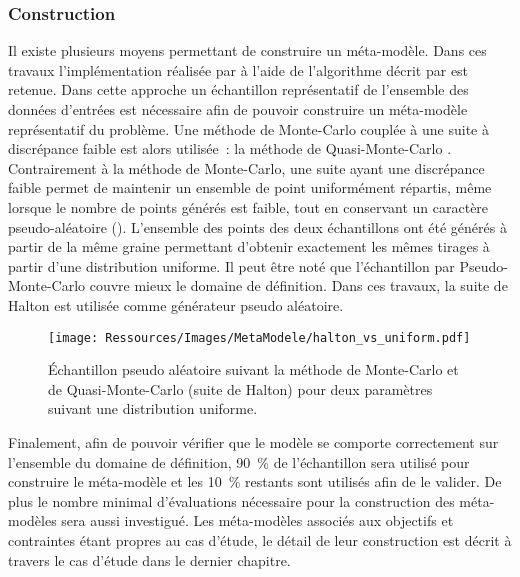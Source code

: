 \subsubsection{Construction} %
\label{ssub:construction}
Il existe plusieurs moyens permettant de construire un méta-modèle. Dans ces travaux
l’implémentation réalisée par \textcite{Rania2013} à l’aide de l’algorithme décrit par
\textcite{Malen2009} est retenue.
Dans cette approche un échantillon représentatif de l’ensemble des données d’entrées est
nécessaire afin de pouvoir construire un méta-modèle représentatif du problème. Une
méthode de Monte-Carlo couplée à une suite à discrépance faible est alors utilisée~: la
méthode de Quasi-Monte-Carlo \parencite{Caflisch19981}. Contrairement à la méthode de
Monte-Carlo, une suite ayant une discrépance faible permet de maintenir un ensemble de
point uniformément répartis, même lorsque le nombre de points générés est faible, tout en
conservant un caractère pseudo-aléatoire (). L’ensemble des
points des deux échantillons ont été générés à partir de la même graine permettant
d’obtenir exactement les mêmes tirages à partir d’une distribution uniforme. Il peut être
noté que l’échantillon par Pseudo-Monte-Carlo couvre mieux le domaine de définition. Dans
ces travaux, la suite de Halton est utilisée comme générateur pseudo aléatoire.

\begin{figure}
    \centering
    \texttt{[image: Ressources/Images/MetaModele/halton\_vs\_uniform.pdf]}
    \caption[Échantillon suivant la méthode de Monte-Carlo et de Quasi-Monte-Carlo]
            {Échantillon pseudo aléatoire suivant la méthode de Monte-Carlo et de
             Quasi-Monte-Carlo (suite de Halton) pour deux paramètres suivant une
             distribution uniforme.}
    \label{fig:halton_vs_uniform}
\end{figure}

Finalement, afin de pouvoir vérifier que le modèle se comporte correctement sur l’ensemble
du domaine de définition, \SI{90}{\percent} de l’échantillon sera utilisé pour construire le
méta-modèle et les \SI{10}{\percent} restants sont utilisés afin de le valider. De plus le
nombre minimal d’évaluations nécessaire pour la construction des méta-modèles sera aussi
investigué. Les méta-modèles associés aux objectifs et contraintes étant propres au cas
d’étude, le détail de leur construction est décrit à travers le cas d’étude dans le
dernier chapitre.


